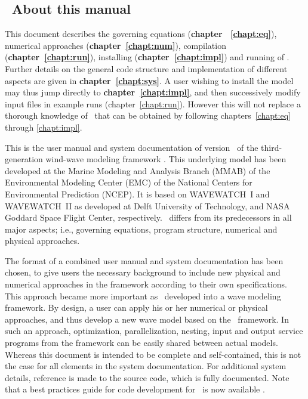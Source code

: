 \vssub
\subsection{~About this manual}
\vssub

This document describes the governing equations (\textbf{chapter ~\ref{chapt:eq}}), numerical approaches (\textbf{chapter~\ref{chapt:num}}),
compilation (\textbf{chapter~\ref{chapt:run}}), installing (\textbf{chapter~\ref{chapt:impl}}) and running of \ws. Further details on the general code 
structure and implementation of different aspects are given in \textbf{chapter~\ref{chapt:sys}}. A user wishing to install the model 
may thus jump directly to \textbf{chapter~\ref{chapt:impl}}, and then successively
modify input files in example runs (chapter~\ref{chapt:run}). However this will not replace a thorough knowledge of \ws\ that can be obtained by
following chapters~\ref{chapt:eq} through \ref{chapt:impl}.



This is the user manual and system documentation of version \WWver\ of the
third-generation wind-wave modeling framework \ww. This underlying model has
been developed at the Marine Modeling and Analysis Branch (MMAB) of the
Environmental Modeling Center (EMC) of the National Centers for Environmental
Prediction (NCEP). It is based on WAVEWATCH~I and WAVEWATCH~II as developed at
Delft University of Technology, and NASA Goddard Space Flight Center,
respectively. \ws\ differs from its predecessors in all major aspects; i.e.,
governing equations, program structure, numerical and physical approaches.



The format of a combined user manual and
system documentation has been chosen, to give users the necessary background
to include new physical and numerical approaches in the framework according to
their own specifications.  This approach became more important as \ws\
developed into a wave modeling framework. By design, a user can apply his or
her numerical or physical approaches, and thus develop a new wave model based
on the \ws\ framework. In such an approach, optimization, parallelization,
nesting, input and output service programs from the framework can be easily
shared between actual models.  Whereas this document is intended to be
complete and self-contained, this is not the case for all elements in the
system documentation. For additional system details, reference is made to the
source code, which is fully documented. Note that a best practices guide for
code development for \ws\ is now available \citep{tol:MMAB10a, tol:MMAB14b}.

